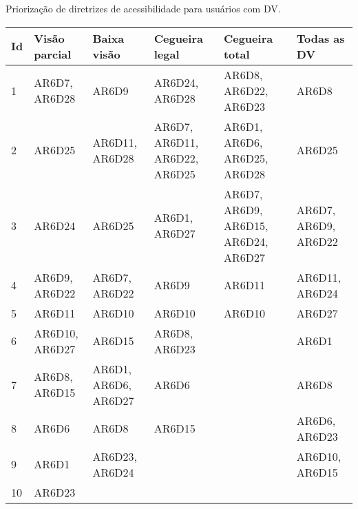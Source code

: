 \begin{quadro}[htb!]
  \begin{center}
    \ABNTEXfontereduzida
    \caption{\label{qua-pri-acc-gui}Priorização de diretrizes de acessibilidade para usuários com DV.}
    \begin{tabular}{|m{0.5cm} | m{2.4cm} | m{2.4cm} | m{2.8cm} | m{3.0cm} | m{2.4cm}|}
      \hline
      \textbf{Id} & \textbf{Visão parcial} & \textbf{Baixa visão} & \textbf{Cegueira legal}       & \textbf{Cegueira total}              & \textbf{Todas as DV} \\
      \hline
      1           & AR6D7, AR6D28          & AR6D9                & AR6D24, AR6D28                & AR6D8, AR6D22, AR6D23                & AR6D8                \\
      \hline
      2           & AR6D25                 & AR6D11, AR6D28       & AR6D7, AR6D11, AR6D22, AR6D25 & AR6D1, AR6D6, AR6D25, AR6D28         & AR6D25               \\
      \hline
      3           & AR6D24                 & AR6D25               & AR6D1, AR6D27                 & AR6D7, AR6D9, AR6D15, AR6D24, AR6D27 & AR6D7, AR6D9, AR6D22 \\
      \hline
      4           & AR6D9, AR6D22          & AR6D7, AR6D22        & AR6D9                         & AR6D11                               & AR6D11, AR6D24       \\
      \hline
      5           & AR6D11                 & AR6D10               & AR6D10                        & AR6D10                               & AR6D27               \\
      \hline
      6           & AR6D10, AR6D27         & AR6D15               & AR6D8, AR6D23                 & \-                                   & AR6D1                \\
      \hline
      7           & AR6D8, AR6D15          & AR6D1, AR6D6, AR6D27 & AR6D6                         & \-                                   & AR6D8                \\
      \hline
      8           & AR6D6                  & AR6D8                & AR6D15                        & \-                                   & AR6D6, AR6D23        \\
      \hline
      9           & AR6D1                  & AR6D23, AR6D24       & \-                            & \-                                   & AR6D10, AR6D15       \\
      \hline
      10          & AR6D23                 & \-                   & \-                            & \-                                   & \-                   \\
      \hline
    \end{tabular}
  \end{center}
\end{quadro}

